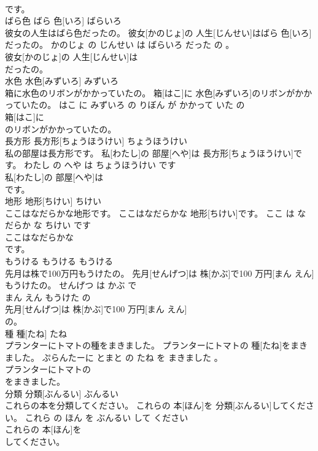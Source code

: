 \documentclass[8pt]{extreport}
\begin{document}
\begin{CJK}{UTF8}{min}
\\	です。			
\\	ばら色	ばら 色[いろ]	ばらいろ	
\\	彼女の人生はばら色だったの。	彼女[かのじょ]の 人生[じんせい]はばら 色[いろ]だったの。	かのじょ の じんせい は ばらいろ だった の 。	
\\	彼女[かのじょ]の 人生[じんせい]は
\\	だったの。			
\\	水色	水色[みずいろ]	みずいろ	
\\	箱に水色のリボンがかかっていたの。	箱[はこ]に 水色[みずいろ]のリボンがかかっていたの。	はこ に みずいろ の りぼん が かかって いた の	
\\	箱[はこ]に
\\	のリボンがかかっていたの。			
\\	長方形	長方形[ちょうほうけい]	ちょうほうけい	
\\	私の部屋は長方形です。	私[わたし]の 部屋[へや]は 長方形[ちょうほうけい]です。	わたし の へや は ちょうほうけい です	
\\	私[わたし]の 部屋[へや]は
\\	です。			
\\	地形	地形[ちけい]	ちけい	
\\	ここはなだらかな地形です。	ここはなだらかな 地形[ちけい]です。	ここ は なだらか な ちけい です	
\\	ここはなだらかな
\\	です。			
\\	もうける	もうける	もうける	
\\	先月は株で100万円もうけたの。	先月[せんげつ]は 株[かぶ]で100 万円[まん えん]もうけたの。	せんげつ は かぶ で 
\\	まん えん もうけた の	
\\	先月[せんげつ]は 株[かぶ]で100 万円[まん えん]
\\	の。			
\\	種	種[たね]	たね	
\\	プランターにトマトの種をまきました。	プランターにトマトの 種[たね]をまきました。	ぷらんたーに とまと の たね を まきました 。	
\\	プランターにトマトの
\\	をまきました。			
\\	分類	分類[ぶんるい]	ぶんるい	
\\	これらの本を分類してください。	これらの 本[ほん]を 分類[ぶんるい]してください。	これら の ほん を ぶんるい して ください	
\\	これらの 本[ほん]を
\\	してください。			

\end{CJK}
\end{document}
